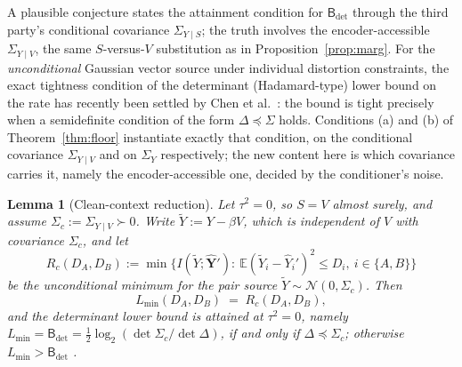 ﻿\documentclass[11pt,onecolumn]{IEEEtran}
\newtheorem{lemma}[theorem]{Lemma}
\newcommand{\E}{\mathbb{E}}
\newcommand{\hY}{\widehat{Y}}
\newcommand{\Bdet}{\mathsf{B}_{\det}}
\begin{document}
A plausible conjecture states the attainment condition for
$\Bdet$ through the third party's conditional covariance
$\Sigma_{Y\mid S}$; the truth involves the encoder-accessible
$\Sigma_{Y\mid V}$, the same $S$-versus-$V$ substitution as in
Proposition~\ref{prop:marg}. For the \emph{unconditional} Gaussian
vector source under individual distortion constraints, the exact
tightness condition of the determinant (Hadamard-type) lower bound on
the rate has recently been settled by Chen et al.\
\cite{chen2026}: the bound is tight precisely when a semidefinite
condition of the form $\Delta\preceq\Sigma$ holds. Conditions (a) and
(b) of Theorem~\ref{thm:floor} instantiate exactly that condition, on
the conditional covariance $\Sigma_{Y\mid V}$ and on $\Sigma_Y$
respectively; the new content here is which covariance carries it,
namely the encoder-accessible one, decided by the conditioner's noise.

\begin{lemma}[Clean-context reduction]\label{lem:cleanctx}
Let $\tau^2=0$, so $S=V$ almost surely, and assume
$\Sigma_c:=\Sigma_{Y\mid V}\succ0$. Write $\widetilde Y:=Y-\beta V$,
which is independent of $V$ with covariance $\Sigma_c$, and let
\[
R_c(D_A,D_B):=\min\bigl\{I(\widetilde Y;\hat{\mathbf Y}'):\
\E(\widetilde Y_i-\hY_i')^2\le D_i,\ i\in\{A,B\}\bigr\}
\]
be the unconditional minimum for the pair source
$\widetilde Y\sim\mathcal N(0,\Sigma_c)$. Then
\[
L_{\min}(D_A,D_B)\;=\;R_c(D_A,D_B),
\]
and the determinant lower bound is attained at $\tau^2=0$, namely
$L_{\min}=\Bdet=\tfrac12\log_2(\det\Sigma_c/\det\Delta)$, if and only
if $\Delta\preceq\Sigma_c$; otherwise $L_{\min}>\Bdet$
\cite{xiaoluo2005,chen2026}.
\end{lemma}
\end{document}
